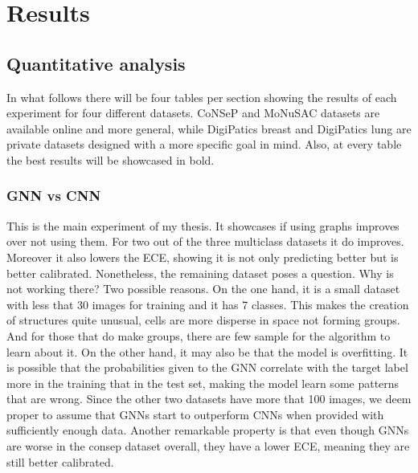 \chapter{Results}
\section{Quantitative analysis}\label{sec:results}

In what follows there will be four tables per section showing the results of each experiment for four different datasets. CoNSeP and MoNuSAC datasets are available online and more general, while DigiPatics breast and DigiPatics lung  are private datasets designed with a more specific goal in mind. Also, at every table the best results will be showcased in bold.

\subsection{GNN vs CNN}

This is the main experiment of my thesis. It showcases if using graphs improves over not using them. For two out of the three multiclass datasets it do improves. Moreover it also lowers the ECE, showing it is not only predicting better but is better calibrated. Nonetheless, the remaining dataset poses a question. Why is not working there? Two possible reasons. On the one hand, it is a small dataset with less that 30 images for training and it has 7 classes. This makes the creation of structures quite unusual, cells are more disperse in space not forming groups. And for those that do make groups, there are few sample for the algorithm to learn about it. On the other hand, it may also be that the model is overfitting. It is possible that the probabilities given to the GNN correlate with the target label more in the training that in the test set, making the model learn some patterns that are wrong. Since the other two datasets have more that 100 images, we deem proper to assume that GNNs start to outperform CNNs when provided with sufficiently enough data. Another remarkable property is that even though GNNs are worse in the consep dataset overall, they have a lower ECE, meaning they are still better calibrated.

